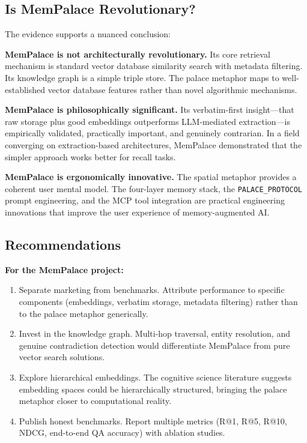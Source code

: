 \documentclass[twoside,11pt]{article}
\begin{document}
\subsection{Is MemPalace Revolutionary?}

The evidence supports a nuanced conclusion:

\textbf{MemPalace is not architecturally revolutionary.}  Its core retrieval
mechanism is standard vector database similarity search with metadata
filtering.  Its knowledge graph is a simple triple store.  The palace metaphor
maps to well-established vector database features rather than novel algorithmic
mechanisms.

\textbf{MemPalace is philosophically significant.}  Its verbatim-first
insight---that raw storage plus good embeddings outperforms LLM-mediated
extraction---is empirically validated, practically important, and genuinely
contrarian.  In a field converging on extraction-based architectures,
MemPalace demonstrated that the simpler approach works better for recall tasks.

\textbf{MemPalace is ergonomically innovative.}  The spatial metaphor provides
a coherent user mental model.  The four-layer memory stack, the
\texttt{PALACE\_PROTOCOL} prompt engineering, and the MCP tool integration are
practical engineering innovations that improve the user experience of
memory-augmented AI.

\subsection{Recommendations}

\textbf{For the MemPalace project:}
\begin{enumerate}[leftmargin=*, label=\arabic*.]
\item Separate marketing from benchmarks.  Attribute performance to specific
  components (embeddings, verbatim storage, metadata filtering) rather than
  to the palace metaphor generically.
\item Invest in the knowledge graph.  Multi-hop traversal, entity resolution,
  and genuine contradiction detection would differentiate MemPalace from pure
  vector search solutions.
\item Explore hierarchical embeddings.  The cognitive science literature
  suggests embedding spaces could be hierarchically structured, bringing the
  palace metaphor closer to computational reality.
\item Publish honest benchmarks.  Report multiple metrics (R@1, R@5, R@10,
  NDCG, end-to-end QA accuracy) with ablation studies.
\end{enumerate}
\end{document}
